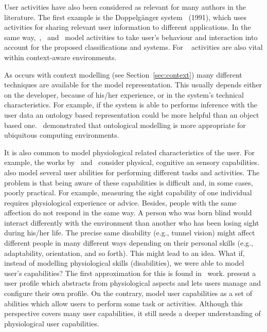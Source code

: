 User activities have also been considered as relevant for many authors in the 
literature. The first example is the Doppelgänger 
system~\citep{orwant_doppelgangeruser_1991} (1991), which uses activities for 
sharing relevant user information to different applications. In the same 
way,~\citet{persad_characterising_2007},~\citet{heckmann_gumogeneral_2005}
and~\citet{skillen2012ontological} model activities to take user's behaviour
and interaction into account for the proposed classifications and systems. For
~\citet{hatala_ontology_based_2005} activities are also vital within 
context-aware environments.

As occurs with context modelling (see Section~\ref{sec:context}) many different 
techniques are available for the model representation. This usually depends either 
on the developer, because of his/her experience, or in the system's technical 
characteristics. For example, if the system is able to performs inference with 
the user data an ontology based representation could be more helpful than an 
object based one.~\citet{strang_context_2004} demonstrated that ontological
modelling is more appropriate for ubiquitous computing environments.

It is also common to model physiological related characteristics of the user.
For example, the works by~\citet{gregor_designing_2002} 
and~\citet{persad_characterising_2007} consider physical, cognitive an sensory 
capabilities.~\citet{skillen2012ontological} also model several user abilities 
for performing different tasks and activities. The problem is that being aware 
of these capabilities is difficult and, in some cases, poorly practical. For 
example, measuring the sight capability of one individual requires physiological 
experience or advice. Besides, people with the same affection do not respond in 
the same way. A person who was born blind would interact differently with the 
environment than another who has been losing sight during his/her life. The 
precise same disability (e.g., tunnel vision) might affect different people 
in many different ways depending on their personal skills (e.g., adaptability,
orientation, and so forth). This might lead to an idea. What if, instead of 
modelling physiological skills (disabilities), we were able to model user's 
capabilities? The first approximation for this is found 
in~\citet{casas_user_2008} work. \citeauthor{casas_user_2008} present a user 
profile which abstracts from physiological aspects and lets users manage and 
configure their own profile. On the contrary, \citet{skillen2012ontological} 
model user capabilities as a set of abilities which allow users to perform some 
task or activities. Although this perspective covers many user capabilities, it
still needs a deeper understanding of physiological user capabilities.

